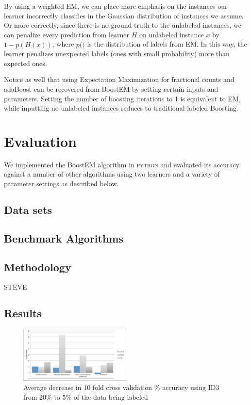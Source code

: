\documentclass{sig-alternate}
\begin{document}
By using a weighted EM, we can place more emphasis on the instances our learner incorrectly classifies in the Gaussian distribution of instances we assume. Or more correctly, since there is no ground truth to the unlabeled instances, we can penalize every prediction from learner $H$ on unlabeled instance $x$ by $1-p(H(x))$, where $p(\dot)$ is the distribution of labels from EM.  In this way, the learner penalizes unexpected labels (ones with small probability) more than expected ones.

Notice as well that using Expectation Maximization for fractional counts and adaBoost can be recovered from BoostEM by setting certain inputs and parameters.  Setting the number of boosting iterations to 1 is equivalent to EM, while inputting no unlabeled instances reduces to traditional labeled Boosting.    
    
\section{Evaluation}
We implemented the BoostEM algorithm in \textsc{python} and evaluated its accuracy against a number of other algorithms using two learners and a variety of parameter settings  as described below.

\subsection{Data sets}


\subsection{Benchmark Algorithms}

\subsection{Methodology}
STEVE
\subsection{Results}


 \begin{figure}
\centering
\includegraphics[width=0.5\textwidth]{figures/accDrops.pdf}
\caption{Average decrease in 10 fold cross validation \% accuracy using ID3 from 20\% to 5\% of the data being labeled}
\label{accDrop}
\end{figure}
 
\end{document}
